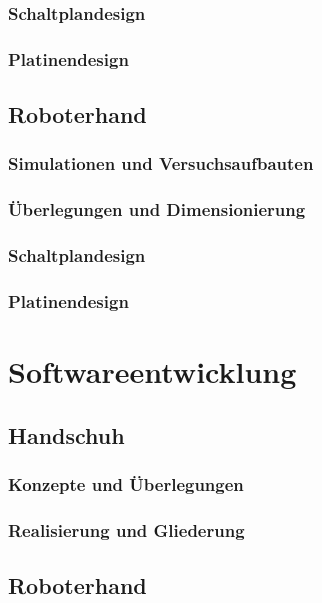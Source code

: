 \documentclass[11pt]{article}
\begin{document}
\subsubsection{Schaltplandesign}
\subsubsection{Platinendesign}

\subsection{Roboterhand}
\subsubsection{Simulationen und Versuchsaufbauten}
\subsubsection{Überlegungen und Dimensionierung}
\subsubsection{Schaltplandesign}
\subsubsection{Platinendesign}


\section{Softwareentwicklung}

\subsection{Handschuh}
\subsubsection{Konzepte und Überlegungen}
\subsubsection{Realisierung und Gliederung}

\subsection{Roboterhand}
\end{document}
